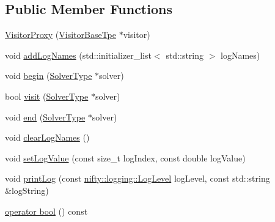 \subsection*{Public Member Functions}
\begin{DoxyCompactItemize}
\item 
\hyperlink{classnifty_1_1graph_1_1optimization_1_1common_1_1VisitorProxy_ad066ff0bd69eaa48e846693d665b369d}{Visitor\+Proxy} (\hyperlink{classnifty_1_1graph_1_1optimization_1_1common_1_1VisitorProxy_abeeba329f198f6a6f05f9af13011e7d2}{Visitor\+Base\+Tpe} $\ast$visitor)
\item 
void \hyperlink{classnifty_1_1graph_1_1optimization_1_1common_1_1VisitorProxy_adf5c63d596e662d1a5c35e167912c27e}{add\+Log\+Names} (std\+::initializer\+\_\+list$<$ std\+::string $>$ log\+Names)
\item 
void \hyperlink{classnifty_1_1graph_1_1optimization_1_1common_1_1VisitorProxy_aa753fee7dfe837b8f168a954ad994128}{begin} (\hyperlink{classnifty_1_1graph_1_1optimization_1_1common_1_1VisitorProxy_a6728a2e754965cff1d6f4dab62aa642e}{Solver\+Type} $\ast$solver)
\item 
bool \hyperlink{classnifty_1_1graph_1_1optimization_1_1common_1_1VisitorProxy_a3981609a88d96a9b13e59a9db2470057}{visit} (\hyperlink{classnifty_1_1graph_1_1optimization_1_1common_1_1VisitorProxy_a6728a2e754965cff1d6f4dab62aa642e}{Solver\+Type} $\ast$solver)
\item 
void \hyperlink{classnifty_1_1graph_1_1optimization_1_1common_1_1VisitorProxy_a9340aa683f5445d064b422c88a7d9233}{end} (\hyperlink{classnifty_1_1graph_1_1optimization_1_1common_1_1VisitorProxy_a6728a2e754965cff1d6f4dab62aa642e}{Solver\+Type} $\ast$solver)
\item 
void \hyperlink{classnifty_1_1graph_1_1optimization_1_1common_1_1VisitorProxy_ae1d55cb7f69c980f212cd730ccee3475}{clear\+Log\+Names} ()
\item 
void \hyperlink{classnifty_1_1graph_1_1optimization_1_1common_1_1VisitorProxy_ae5342f50576cac731abd6659f85a45ef}{set\+Log\+Value} (const size\+\_\+t log\+Index, const double log\+Value)
\item 
void \hyperlink{classnifty_1_1graph_1_1optimization_1_1common_1_1VisitorProxy_aa010b211518a2ff8fe8d42a1cea873fc}{print\+Log} (const \hyperlink{namespacenifty_1_1logging_a3385625f9a0dbb17f70c47d3fca2f64d}{nifty\+::logging\+::\+Log\+Level} log\+Level, const std\+::string \&log\+String)
\item 
\hyperlink{classnifty_1_1graph_1_1optimization_1_1common_1_1VisitorProxy_a6bfb84aeddc78f6dd7d73e26872d5af6}{operator bool} () const 
\end{DoxyCompactItemize}



